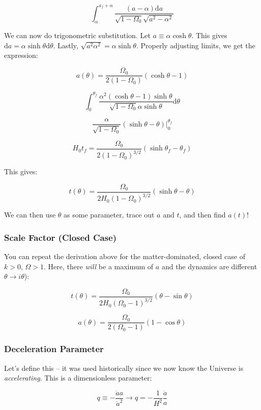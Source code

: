 \documentclass{article}
\newcommand{\be}{\begin{equation}}
\newcommand{\ee}{\end{equation}}
\begin{document}
\be
\int_\alpha^{a_f + \alpha} \frac{\left(a-\alpha\right)\mathrm{d}a}{\sqrt{1-\Omega_0} \sqrt{a^2 - \alpha^2}}
\ee

We can now do trigonometric substitution. Let $a\equiv \alpha \cosh \theta$. This gives $\mathrm{d}a = \alpha \sinh\theta \mathrm{d}\theta$. Lastly, $\sqrt{a^2\alpha^2} = \alpha\sinh\theta$. Properly adjusting limits, we get the expression:

\be
\boxed{a(\theta) = \frac{\Omega_0}{2\left(1-\Omega_0\right)}\left(\cosh\theta-1\right)}
\ee

\be
\int_{0}^{\theta_f} \frac{\alpha^2\left(\cosh\theta-1\right)\sinh\theta}{\sqrt{1-\Omega_0} \alpha \sinh\theta} \mathrm{d}\theta
\ee

\be
\frac{\alpha}{\sqrt{1-\Omega_0}}\left(\sinh\theta - \theta\right)\rvert_0^{\theta_f}
\ee

\be
H_0 t_f = \frac{\Omega_0}{2\left(1-\Omega_0\right)^{3/2}} \left(\sinh\theta_f -\theta_f\right)
\ee

This gives:

\be
\boxed{t(\theta) = \frac{\Omega_0}{2H_0\left(1-\Omega_0\right)^{3/2}}\left(\sinh\theta - \theta\right)}
\ee

We can then use $\theta$ as some parameter, trace out $a$ and $t$, and then find $a(t)$!

\subsubsection{Scale Factor (Closed Case)}

You can repeat the derivation above for the matter-dominated, closed case of $k >0$, $\Omega > 1$. Here, there \textit{will} be a maximum of $a$ and the dynamics are different $\theta \rightarrow i \theta$):

\be
\boxed{t(\theta) = \frac{\Omega_0}{2H_0\left(\Omega_0-1\right)^{3/2}}\left(\theta-\sin\theta\right)}
\ee

\be
\boxed{a(\theta) = \frac{\Omega_0}{2\left(\Omega_0-1\right)}\left(1-\cos\theta\right)}
\ee

\subsubsection{Deceleration Parameter}

Let's define this -- it was used historically since we now know the Universe is \textit{accelerating}. This is a dimensionless parameter:

\be
q \equiv -\frac{\ddot{a}a}{\dot{a}^2} \rightarrow q = - \frac{1}{H^2} \frac{\ddot{a}}{a}
\ee
\end{document}
